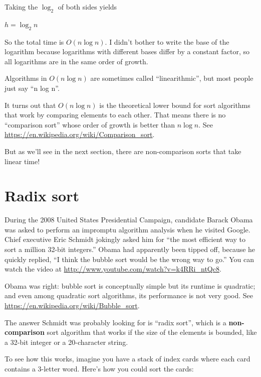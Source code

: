 \documentclass[12pt]{book}
\theoremstyle{exercise}
\newcommand{\java}{\verb}%}
\begin{document}
Taking the $\log_2$ of both sides yields

$h = \log_2 n$

So the total time is $O(n \log n)$. I didn't bother to write the
base of the logarithm because logarithms with different bases differ by
a constant factor, so all logarithms are in the same order of growth.

Algorithms in $O(n \log n)$ are sometimes called
``linearithmic'', but most people just say ``n log n''.

It turns out that $O(n \log n)$ is the theoretical lower bound for
sort algorithms that work by comparing elements to each other. That
means there is no ``comparison sort''
whose order of growth is better than $n \log n$.
See \url{https://en.wikipedia.org/wiki/Comparison_sort}.

But as we'll see in the next section, there are non-comparison sorts
that take linear time!


\section{Radix sort}
\label{radix-sort}

During the 2008 United States Presidential Campaign, candidate Barack
Obama was asked to perform an impromptu algorithm analysis when he
visited Google. Chief executive Eric Schmidt jokingly asked him for
``the most efficient way to sort a million 32-bit integers.'' Obama had
apparently been tipped off, because he quickly replied, ``I think the
bubble sort would be the wrong way to go.'' You can watch the
video at
\url{http://www.youtube.com/watch?v=k4RRi_ntQc8}.

Obama was right: bubble
sort is conceptually simple but its runtime is quadratic; and even
among quadratic sort algorithms, its performance is not very good.
See \url{https://en.wikipedia.org/wiki/Bubble_sort}.

The answer Schmidt was probably looking for is ``radix sort'', which is
a {\bf non-comparison} sort algorithm that works if the size of the
elements is bounded, like a 32-bit integer or a 20-character string.

To see how this works, imagine you have a stack of index cards where
each card contains a 3-letter word. Here's how you could sort the
cards:

\end{document}
